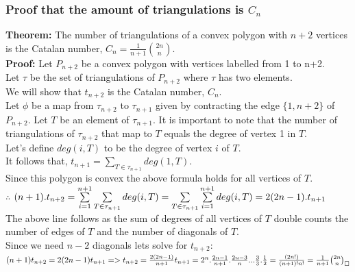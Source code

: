 \documentclass[12pt]{article}
\begin{document}
\subsubsection{Proof that the amount of triangulations is $C_n$}
{\bf Theorem:} The number of triangulations of a convex polygon with $n+2$ vertices is the Catalan number, $C_n = \frac{1}{n+1} \binom{2n}{n}$. \cite{DiscMathsRosen}\\
{\bf Proof:} Let $P_{n+2}$ be a convex polygon with vertices labelled from 1 to n+2.\\
Let $\tau$ be the set of triangulations of $P_{n+2}$ where $\tau$ has two elements.\\
We will show that $t_{n+2}$ is the Catalan number, $C_n$.\\
Let $\phi$ be a map from $\tau_{n+2}$ to $\tau_{n+1}$ given by contracting the edge $\{1, n+2\}$ of $P_{n+2}$.
Let $T$ be an element of $\tau_{n+1}$. It is important to note that the number of triangulations of $\tau_{n+2}$ that map to $T$ equals the degree of vertex 1 in $T$.\\
Let's define $deg(i, T)$ to be the degree of vertex $i$ of $T$.\\
It follows that, $t_{n+1} = \sum\limits_{T\in\tau_{n+1}} deg(1, T)$.\\
Since this polygon is convex the above formula holds for all vertices of $T$.\\
$\therefore$ $(n+1).t_{n+2} = \sum\limits_{i=1}^{n+1} \sum\limits_{T\in\tau_{n+1}} deg(i, T)\\
                            = \sum\limits_{T\in\tau_{n+1}} \sum\limits_{i=1}^{n+1} deg(i, T)\\
                            = 2(2n-1).t_{n+1}$\\
The above line follows as the sum of degrees of all vertices of $T$ double counts the number of edges of $T$ and the number of diagonals of $T$.\\
Since we need $n-2$ diagonals lets solve for $t_{n+2}$:\\
$(n+1)t_{n+2} = 2(2n-1)t_{n+1}\\
=>t_{n+2} = \frac{2(2n-1)}{n+1} t_{n+1} = 2^n.\frac{2n-1}{n+1}.\frac{2n-3}{n} ... \frac{3}{3}.\frac{1}{2}\\
=\frac{(2n!)}{(n+1)!n!}\\
=\frac{1}{n+1} \binom{2n}{n}_\square$

\end{document}
